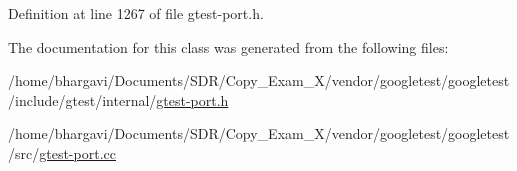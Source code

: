Definition at line 1267 of file gtest-\/port.\+h.



The documentation for this class was generated from the following files\+:\begin{DoxyCompactItemize}
\item 
/home/bhargavi/\+Documents/\+S\+D\+R/\+Copy\+\_\+\+Exam\+\_\+X/vendor/googletest/googletest/include/gtest/internal/\hyperlink{gtest-port_8h}{gtest-\/port.\+h}\item 
/home/bhargavi/\+Documents/\+S\+D\+R/\+Copy\+\_\+\+Exam\+\_\+X/vendor/googletest/googletest/src/\hyperlink{gtest-port_8cc}{gtest-\/port.\+cc}\end{DoxyCompactItemize}
